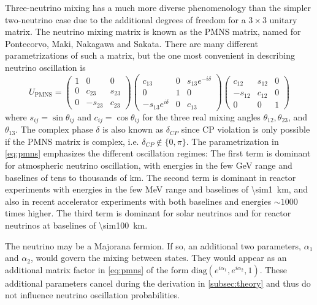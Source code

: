 Three-neutrino mixing has a much more diverse phenomenology
than the simpler two-neutrino case
due to the additional degrees of freedom for a $3\times3$ unitary matrix.
The neutrino mixing matrix is known as the PMNS matrix,
named for Pontecorvo, Maki, Nakagawa and Sakata.
There are many different parametrizations of such a matrix,
but the one most convenient in describing neutrino oscillation is
\begin{equation}\label{eq:pmns}
    U_{\text{PMNS}} =
    \begin{pmatrix}
        1 & 0 & 0 \\
        0 & c_{23} & s_{23} \\
        0 & -s_{23} & c_{23}
    \end{pmatrix}
    \begin{pmatrix}
        c_{13} & 0 & s_{13}e^{-i\delta} \\
        0 & 1 & 0 \\
        -s_{13}e^{i\delta} & 0 & c_{13}
    \end{pmatrix}
    \begin{pmatrix}
        c_{12} & s_{12} & 0 \\
        -s_{12} & c_{12} & 0 \\
        0 & 0 & 1
    \end{pmatrix}
\end{equation}
where $s_{ij} = \sin\theta_{ij}$ and $c_{ij} = \cos\theta_{ij}$
for the three real mixing angles
$\theta_{12},\theta_{23}$, and $\theta_{13}$.
The complex phase $\delta$ is also known as $\delta_{CP}$
since CP violation is only possible if the PMNS matrix is complex,
i.e. $\delta_{CP} \notin \{0, \pi\}$.
The parametrization in \cref{eq:pmns} emphasizes the different oscillation regimes:
The first term is dominant for atmospheric neutrino oscillation,
with energies in the few \si{\GeV} range
and baselines of tens to thousands of \si{\km}.
The second term is dominant in reactor experiments
with energies in the few \si{\MeV} range
and baselines of \SI{\sim1}{\km},
and also in recent accelerator experiments
with both baselines and energies $\sim1000$ times higher.
The third term is dominant for solar neutrinos
and for reactor neutrinos at baselines of \SI{\sim100}{\km}.

The neutrino may be a Majorana fermion.
If so, an additional two parameters, $\alpha_1$ and $\alpha_2$,
would govern the mixing between states.
They would appear as an additional matrix factor in \cref{eq:pmns}
of the form $\text{diag}(e^{i\alpha_1}, e^{i\alpha_2}, 1)$.
These additional parameters cancel
during the derivation in \cref{subsec:theory}
and thus do not influence neutrino oscillation probabilities.

